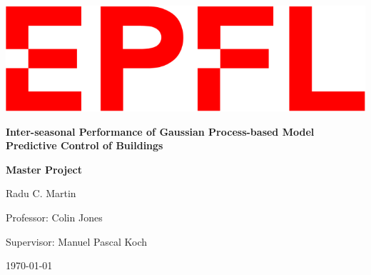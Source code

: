 \begin{titlepage}
\begin{center}

\includegraphics[width=0.5\linewidth]{Logo-EPFL.png}\par
\vspace{5cm}

{\huge \bf 
{}
Inter-seasonal Performance of Gaussian Process-based
Model Predictive Control of Buildings
\par}

\vspace{2cm}
{\LARGE \bf Master Project\par}

\vspace{6cm}
{\Large Radu C. Martin}\par
\vspace{2cm}

{\large Professor: Colin Jones}\par
{\large Supervisor: Manuel Pascal Koch}\par

\vspace{0.5cm}
{\large\today}

\end{center}
\end{titlepage}
